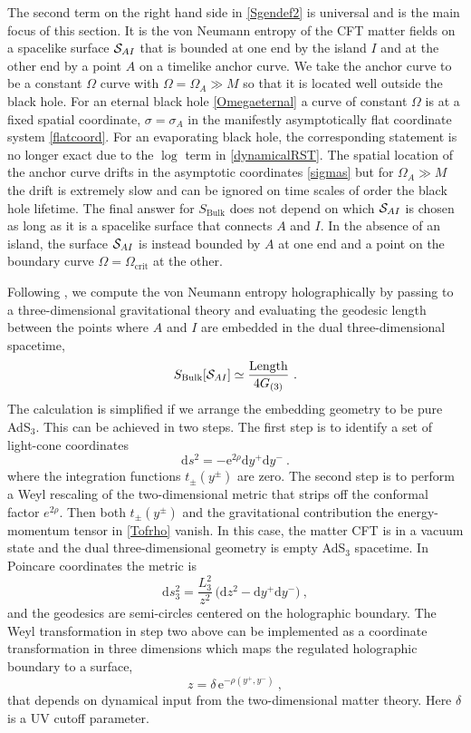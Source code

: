 \documentclass[12pt,a4paper]{article}
\newcommand{\dd}{\mathrm{d}}
\newcommand{\e}{\mathrm{e}}
\newcommand{\be}{\begin{equation}}
\newcommand{\ee}{\end{equation}}
\newcommand{\f}[2]{\frac{#1}{#2}}
\begin{document}
The second term on the right hand side in \eqref{Sgendef2} is universal and is the main focus of this section. It is the von Neumann entropy of the CFT matter fields on a spacelike surface ${\cal S}_{AI}$ that is bounded at one end by the island $I$ and at the other end by a point $A$ on a timelike anchor curve. We take the anchor curve to be a constant $\Omega$ curve with $\Omega=\Omega_A\gg M$ so that it is located well outside the black hole. For an eternal black hole \eqref{Omegaeternal} a curve of constant $\Omega$ is at a fixed spatial coordinate, $\sigma=\sigma_A$ in the manifestly asymptotically flat coordinate system \eqref{flatcoord}. For an evaporating black hole, the corresponding statement is no longer exact due to the $\log$ term in \eqref{dynamicalRST}. The spatial location of the anchor curve drifts in the asymptotic coordinates \eqref{sigmas} but for $\Omega_A\gg M$ the drift is extremely slow and can be ignored on time scales of order the black hole lifetime.
The final answer for $S_\text{Bulk}$ does not depend on which ${\cal S}_{AI}$ is chosen as long as it is a spacelike surface that connects $A$ and $I$.
In the absence of an island, the surface ${\cal S}_{AI}$ is instead bounded by $A$ at one end and a point on the boundary curve $\Omega=\Omega_\text{crit}$ at the other.

Following \cite{Almheiri:2019hni}, we compute the von Neumann entropy holographically by passing to a three-dimensional gravitational theory and evaluating the geodesic length between the points where $A$ and $I$ are embedded in the dual three-dimensional spacetime,
\be \label{eq:rt_3d}
S_\text{Bulk}[{\cal S}_{AI}] \simeq \f{\text{Length}}{4G_{(3)}}~.
\ee
The calculation is simplified if we arrange the embedding geometry to be pure AdS$_3$. This can be achieved in two steps.
The first step is to identify a set of light-cone coordinates 
\be
\dd s^2 = -\e^{2\rho} \dd y^+\dd y^-~.
\ee
where the integration functions $t_\pm(y^\pm)$ are zero.
The second step is to perform a Weyl rescaling of the two-dimensional metric that strips off the conformal factor $e^{2\rho}$.  
Then both $t_\pm(y^\pm)$ and the gravitational contribution the energy-momentum tensor in \eqref{Tofrho} vanish. In this case, the matter CFT is in a vacuum state and the dual three-dimensional geometry is empty AdS$_3$ spacetime. In Poincare coordinates the metric is 
\be
\dd s_3^2 = \f{L_3^2}{z^2}\,\big(\dd z^2 - \dd y^+\dd y^-\big)~,
\ee
and the geodesics are semi-circles centered on the holographic boundary. 
The Weyl transformation in step two above can be implemented as a coordinate transformation in three dimensions which maps the regulated holographic boundary to a surface,  
\be
z=\delta \, \e^{-\rho(y^+,y^-)}~,
\ee
that depends on dynamical input from the two-dimensional matter theory. Here $\delta$ is a UV cutoff parameter. 
\end{document}
